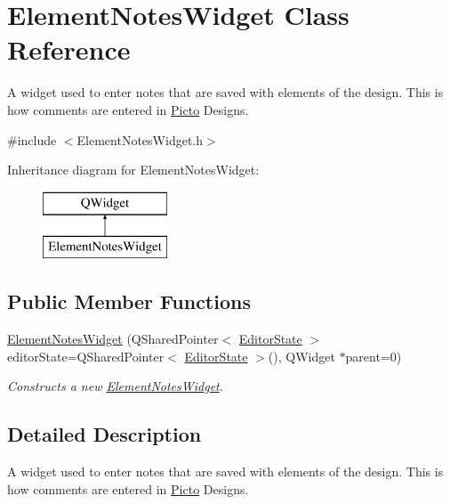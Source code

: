 \hypertarget{class_element_notes_widget}{\section{Element\-Notes\-Widget Class Reference}
\label{class_element_notes_widget}
}


A widget used to enter notes that are saved with elements of the design. This is how comments are entered in \hyperlink{namespace_picto}{Picto} Designs.  




{\ttfamily \#include $<$Element\-Notes\-Widget.\-h$>$}

Inheritance diagram for Element\-Notes\-Widget\-:\begin{figure}[H]
\begin{center}
\leavevmode
\includegraphics[height=2.000000cm]{class_element_notes_widget}
\end{center}
\end{figure}
\subsection*{Public Member Functions}
\begin{DoxyCompactItemize}
\item 
\hyperlink{class_element_notes_widget_a6d32294df9e2171fc0eca9cc3b0bc588}{Element\-Notes\-Widget} (Q\-Shared\-Pointer$<$ \hyperlink{class_editor_state}{Editor\-State} $>$ editor\-State=Q\-Shared\-Pointer$<$ \hyperlink{class_editor_state}{Editor\-State} $>$(), Q\-Widget $\ast$parent=0)
\begin{DoxyCompactList}\small\item\em Constructs a new \hyperlink{class_element_notes_widget}{Element\-Notes\-Widget}. \end{DoxyCompactList}\end{DoxyCompactItemize}


\subsection{Detailed Description}
A widget used to enter notes that are saved with elements of the design. This is how comments are entered in \hyperlink{namespace_picto}{Picto} Designs. 


